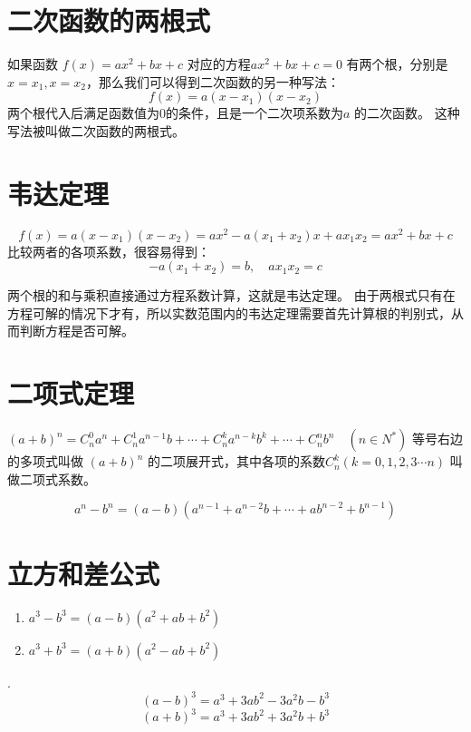 \documentclass[a4paper,12pt]{ctexart}
\begin{document}
\section*{二次函数的两根式}

如果函数 $f(x) = ax^2 + bx + c$ 对应的方程$ax^2 + bx + c = 0$ 有两个根，分别是 $x = x_1, x = x_2$，那么我们可以得到二次函数的另一种写法：
\[ f(x) = a(x - x_1)(x - x_2) \]
两个根代入后满足函数值为0的条件，且是一个二次项系数为$a$ 的二次函数。
这种写法被叫做二次函数的两根式。

\section*{韦达定理}

\[ f(x) = a(x - x_1)(x - x_2) = ax^2 - a(x_1 + x_2)x + ax_1 x_2 = ax^2 + bx + c \]
比较两者的各项系数，很容易得到：
\[ -a(x_1 + x_2) = b, \quad ax_1 x_2 = c \]

两个根的和与乘积直接通过方程系数计算，这就是韦达定理。
由于两根式只有在方程可解的情况下才有，所以实数范围内的韦达定理需要首先计算根的判别式，从而判断方程是否可解。

\section*{二项式定理}

$(a+b)^n = C_n^0 a^n + C_n^1 a^{n-1}b + \cdots + C_n^k a^{n-k}b^k + \cdots + C_n^n b^n \quad (n \in N^*)$ 等号右边的多项式叫做 $(a+b)^n$ 的二项展开式，其中各项的系数$C_n^k (k=0,1,2,3 \cdots n)$ 叫做二项式系数。

\[ a^n - b^n = (a-b)(a^{n-1} + a^{n-2}b + \cdots + ab^{n-2} + b^{n-1}) \]

\section*{立方和差公式}

\begin{enumerate}
    \item $a^3 - b^3 = (a-b)(a^2 + ab + b^2)$
    \item $a^3 + b^3 = (a+b)(a^2 - ab + b^2)$
\end{enumerate}

.
\[ (a-b)^3 = a^3 + 3ab^2 - 3a^2b - b^3 \]
\[ (a+b)^3 = a^3 + 3ab^2 + 3a^2b + b^3 \]
\newpage
\end{document}
